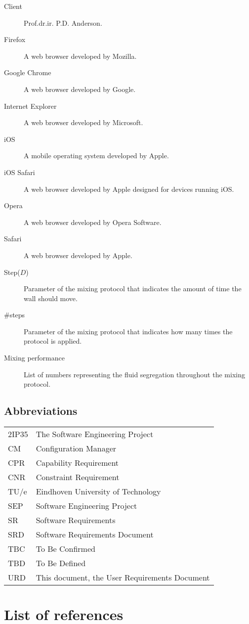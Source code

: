 \begin{description}
\item[Client] Prof.dr.ir. P.D. Anderson.
\item[Firefox] A web browser developed by Mozilla.
\item[Google Chrome] A web browser developed by Google.
\item[Internet Explorer] A web browser developed by Microsoft.
\item[iOS] A mobile operating system developed by Apple.
\item[iOS Safari] A web browser developed by Apple designed for devices running iOS.
\item[Opera] A web browser developed by Opera Software.
\item[Safari] A web browser developed by Apple.
\item[Step($D$)] Parameter of the mixing protocol that indicates the amount of time the wall should move.
\item[\#steps] Parameter of the mixing protocol that indicates how many times the protocol is applied.
\item[Mixing performance] List of numbers representing the fluid segregation throughout the mixing protocol.
\end{description}

\subsection{Abbreviations}
\begin{tabular}{l|l}
2IP35 & The Software Engineering Project \\
CM    &Configuration Manager \\
CPR & Capability Requirement \\
CNR & Constraint Requirement \\
TU/e  &Eindhoven University of Technology \\
SEP   &Software Engineering Project \\
SR    &Software Requirements \\
SRD   &Software Requirements Document \\
TBC & To Be Confirmed \\
TBD & To Be Defined \\
URD & This document, the User Requirements Document \\
\end{tabular}

\section{List of references}

